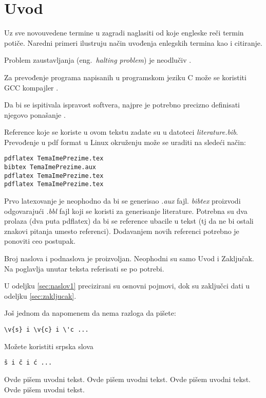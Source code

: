
\section{Uvod}
\label{sec:uvod}

Uz sve novouvedene termine u zagradi naglasiti od koje engleske reči termin potiče. Naredni primeri ilustruju način uvođenja enlegskih termina kao i citiranje.

\begin{theorem}
Problem zaustavljanja (eng.~{\em halting problem}) je neodlučiv \cite{haltingproblem}.
\end{theorem}

\begin{theorem}
Za prevođenje programa napisanih u programskom jeziku C može se koristiti GCC kompajler \cite{gcc}.
\end{theorem}

\begin{theorem}
 Da bi se ispitivala ispravost softvera, najpre je potrebno precizno definisati njegovo ponašanje \cite{laski2009software}.
\end{theorem}

Reference koje se koriste u ovom tekstu zadate su u datoteci {\em literature.bib}. Prevođenje u pdf format u Linux okruženju može se uraditi na sledeći način:
\begin{verbatim}
pdflatex TemaImePrezime.tex
bibtex TemaImePrezime.aux
pdflatex TemaImePrezime.tex
pdflatex TemaImePrezime.tex
\end{verbatim}
Prvo latexovanje je neophodno da bi se generisao {\em .aux} fajl. {\em bibtex} proizvodi odgovarajući {\em .bbl} fajl koji se koristi za generisanje literature.
Potrebna su dva prolaza (dva puta pdflatex) da bi se reference ubacile u tekst (tj da ne bi ostali znakovi pitanja umesto referenci). Dodavanjem novih referenci potrebno je ponoviti ceo postupak.


Broj naslova i podnaslova je proizvoljan. Neophodni su samo Uvod i Zaključak. Na poglavlja unutar teksta referisati se po potrebi.
\begin{theorem}
U odeljku \ref{sec:naslov1} precizirani su osnovni pojmovi, dok su zaključci dati u odeljku \ref{sec:zakljucak}.
\end{theorem}

Još jednom da napomenem da nema razloga da pišete:
\begin{verbatim}
\v{s} i \v{c} i \'c ...
\end{verbatim}
Možete koristiti srpska slova
\begin{verbatim}
š i č i ć ...
\end{verbatim}


Ovde pišem uvodni tekst.
Ovde pišem uvodni tekst.
Ovde pišem uvodni tekst.
Ovde pišem uvodni tekst.
